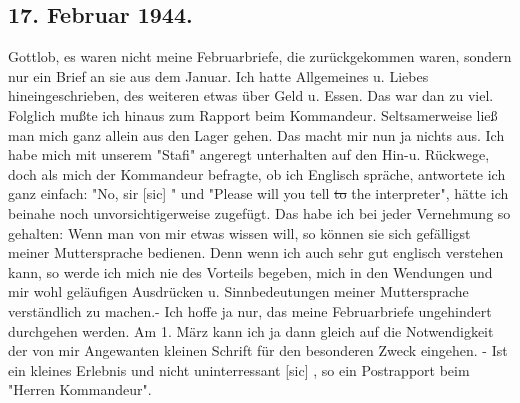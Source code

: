 \subsection{17. Februar 1944.}

Gottlob, es waren nicht meine Februarbriefe, die zur\"{u}ckgekommen waren, sondern nur ein Brief an sie aus dem Januar.
Ich hatte Allgemeines u. Liebes hineingeschrieben, des weiteren etwas \"{u}ber Geld u. Essen.
Das war dan zu viel.
Folglich mu{\ss}te ich hinaus zum Rapport beim Kommandeur.
Seltsamerweise lie{\ss} man mich ganz allein aus den Lager gehen.
Das macht mir nun ja nichts aus.
Ich habe mich mit unserem "Stafi" angeregt unterhalten auf den Hin-u. R\"{u}ckwege, doch als mich der Kommandeur befragte, ob ich Englisch spr\"{a}che, antwortete ich ganz einfach: "No, sir{\color{red} [sic] }" und "Please will you tell \st{to} the interpreter", h\"{a}tte ich beinahe noch unvorsichtigerweise zugef\"{u}gt.
Das habe ich bei jeder Vernehmung so gehalten: Wenn man von mir etwas wissen will, so k\"{o}nnen sie sich gef\"{a}lligst meiner Muttersprache bedienen.
Denn wenn ich auch sehr gut englisch verstehen kann, so werde ich mich nie des Vorteils begeben, mich in den Wendungen und mir wohl gel\"{a}ufigen Ausdr\"{u}cken u. Sinnbedeutungen meiner Muttersprache verst\"{a}ndlich zu machen.-
Ich hoffe ja nur, das meine Februarbriefe ungehindert durchgehen werden.
Am 1. M\"{a}rz kann ich ja dann gleich auf die Notwendigkeit der von mir Angewanten kleinen Schrift f\"{u}r den besonderen Zweck eingehen.
- Ist ein kleines Erlebnis und nicht uninterressant{\color{red} [sic] }, so ein Postrapport beim "Herren Kommandeur".

\clearpage
